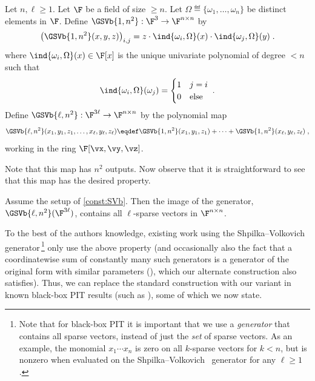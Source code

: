 \documentclass[11pt]{article}
\numberwithin{equation}{section}
\theoremstyle{definition}
\theoremstyle{plain}
\begin{document}
\begin{construction}\label{const:SVb}
        Let $n,\ell\ge 1$. Let $\F$ be a field of size $\ge n$. Let $\Omega\eqdef\{\omega_1,\ldots,\omega_n\}$ be distinct elements in $\F$. Define $\GSVb{1,n^2}:\F^3\to\F^{n\times n}$ by
        \[
                \left(\GSVb{1,n^2}(x,y,z)\right)_{i,j}=z\cdot \ind{\omega_i,\Omega}(x)\cdot\ind{\omega_j,\Omega}(y)
                \;.
        \]
        where $\ind{\omega_i,\Omega}(x)\in\F[x]$ is the unique univariate polynomial of degree $<n$ such that
        \[
                \ind{\omega_i,\Omega}(\omega_j)=
                \begin{cases}
                        1       &       j=i\\
                        0       &       \text{else}
                \end{cases}
                \;.
        \]
        Define $\GSVb{\ell,n^2}:\F^{3\ell}\to\F^{n\times n}$ by the polynomial map
        \[
                \GSVb{\ell,n^2}(x_1,y_1,z_1,\ldots,x_\ell,y_\ell,z_\ell)\eqdef\GSVb{1,n^2}(x_1,y_1,z_1)+\cdots+\GSVb{1,n^2}(x_\ell,y_\ell,z_\ell)
                \;,
        \]
        working in the ring $\F[\vx,\vy,\vz]$.
\end{construction}

Note that this map has $n^2$ outputs. Now observe that it is straightforward to see that this map has the desired property.

\begin{lemmawp}
        Assume the setup of \autoref{const:SVb}.  Then the image of the generator, $\GSVb{\ell,n^2}(\F^{3\ell})$, contains all $\ell$-sparse vectors in $\F^{n\times n}$.
\end{lemmawp}
%

To the best of the authors knowledge, existing
%
work   %
using the Shpilka--Volkovich~\cite{ShpilkaVolkovich09} generator\,\footnote{Note that for black-box PIT it is important that we use a \emph{generator} that contains all sparse vectors, instead of just the \emph{set} of sparse vectors. As an example, the monomial $x_1\cdots x_n$ is zero on all $k$-sparse vectors for $k<n$, but is nonzero when evaluated on the Shpilka--Volkovich~\cite{ShpilkaVolkovich09} generator for any $\ell\ge 1$.} only use the above property (and occasionally also the fact that a
%
coordinatewise  %
sum of %
constantly many  %
such generators is a generator of the original form with similar parameters (\cite{AgrawalSS13,ForbesSS14,GurjarKST15,Forbes15}), which our alternate construction also satisfies).
Thus, %
we can replace the standard construction with our variant in known black-box PIT results (such as \cite{ShpilkaVolkovich09,AgrawalSS13,ForbesShpilka13a,ForbesSS14,GurjarKST15,Forbes15}), some of which we now state.
\end{document}
